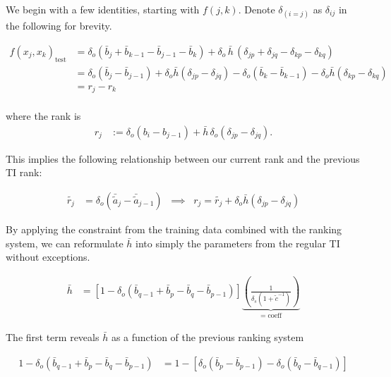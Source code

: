 \documentclass{article}
\theoremstyle{plain}
\begin{document}
We begin with a few identities, starting with $f(j,k)$.  Denote $ \delta_{(i=j)}$ as $ \delta_{ij}$ in the following for brevity.

\begin{align*}
f(x_j, x_k)_{\text{test}} 
  &= \delta_o \left( \bar{b}_j + \bar{b}_{k-1} - \bar{b}_{j-1} - \bar{b}_k \right) 
     + \delta_o \, \bar{h} \, (\delta_{jp} + \delta_{jq} 
     - \delta_{kp} - \delta_{kq}) \\
  &= \delta_o (\bar{b}_j - \bar{b}_{j-1}) 
     + \delta_o \bar{h} (\delta_{jp} - \delta_{jq}) 
     - \delta_o (\bar{b}_k - \bar{b}_{k-1}) 
     - \delta_o \bar{h} (\delta_{kp} - \delta_{kq}) \\
  &= r_j - r_k \\
  \end{align*}
  
where the rank is
\begin{align}
  r_j &:= \delta_o \left( b_i - b_{j-1} \right) + \bar{h} \, \delta_o \left( \delta_{jp} - \delta_{jq} \right) \tag{R1}.
\end{align}

This implies the following relationship between our current rank and the previous TI rank:

\begin{align*}
\tilde{r_j} &= \delta_o (\bar{\tilde{a}}_j - \bar{\tilde{a}}_{j-1}) 
   \;\;\implies\;\; 
   r_j = \tilde{r_j} + \delta_o \bar{h} (\delta_{jp} - \delta_{jq})
\end{align*}

By applying the constraint from the training data combined with the ranking system, we can reformulate $\bar{h}$ into simply the parameters from the regular TI without exceptions.  

\begin{align*}
\bar{h} &= \left[ 1 - \delta_o \left( \bar{b}_{q-1} + \bar{b}_p - \bar{b}_q - \bar{b}_{p-1} \right) \right] 
\underbrace{\left( \frac{1}{\delta_s (1 + \tilde{c}^{-1})} \right)}_{=\;\text{coeff}}
\end{align*}

The first term reveals $\bar{h}$ as a function of the previous ranking system

\begin{align}
     1 - \delta_o \left( \bar{b}_{q-1} + \bar{b}_p - \bar{b}_q - \bar{b}_{p-1} \right) 
     &=  1 - \left[ \delta_o ( \bar{b}_p - \bar{b}_{p-1} ) - \delta_o ( \bar{b}_q - \bar{b}_{q-1} ) \right] 
\end{align}
\end{document}
